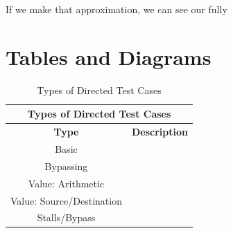 \documentclass[10pt]{article}
\begin{document}
If we make that approximation, we can see our fully 


\pagebreak[4]

\section {Tables and Diagrams}


\begin{table}[h]
\begin{center}
\begin{tabular}{| c | c |}
\hline
\multicolumn{2}{|c|}{Types of Directed Test Cases}   \\
\hline
\textbf{Type}                         &    \textbf{Description}  	\\   \hline      
Basic            					  &           					\\
Bypassing                             &								\\
Value: Arithmetic           		  &          					\\        
Value: Source/Destination             & 							\\
Stalls/Bypass 						  & 							\\
\hline                                                 
\end{tabular}
\caption{Types of Directed Test Cases} 
\label{table:tests}
\end{center}
\end{table}


\end{document}
